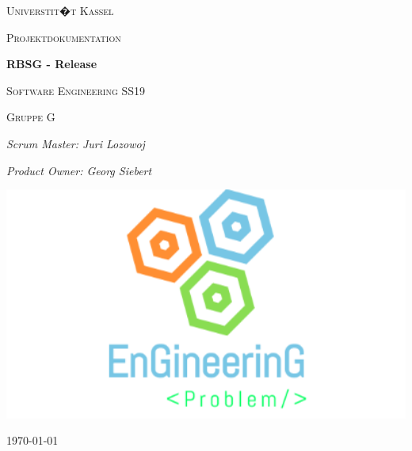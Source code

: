 \documentclass[12pt, titlepage]{scrartcl}
\newcommand{\RN}[1]{%
	\textup{\uppercase\expandafter{\romannumeral#1}}%
}
\begin{document}
	\begin{titlepage}
		\centering
		{\scshape\LARGE Universtit�t Kassel \par}
		\vspace{1cm}
		{\scshape\Large Projektdokumentation\par}
		\vspace{1.5cm}
		{\huge\bfseries RBSG - Release \RN{2}\par}
		\vspace{2cm}
		{\scshape\Large Software Engineering \RN{1} SS19\par}
		\vspace{0.5cm}
		{\scshape\Large Gruppe G\par}
		\vspace{0.5cm}
		{\Large\itshape Scrum Master: Juri Lozowoj\par}
		\vspace{0.5cm}
		{\Large\itshape Product Owner: Georg Siebert\par}
		\vspace{2cm}
		{\includegraphics[width=1\textwidth]{Logo.png}\par}
		\vfill
	\vfill
	
	{\large \today\par}
	\end{titlepage}
	\begin{abstract}
		Diese Dokumentation beschreibt das zweite Release des Projektes RBSG von Team G. Dies umfasst die Auflistung und Erl�uterung der Mockups und der Domain Stories. Beide Sprints werden dokumentiert und analysiert. Zum Schluss wird das Resultat des Releases mit den Zielen verglichen und es wird auf  Probleme oder nicht erf�llte Anforderungen eingegangen.
	\end{abstract}
	\tableofcontents
	\newpage
	\setcounter{page}{1}
\end{document}
